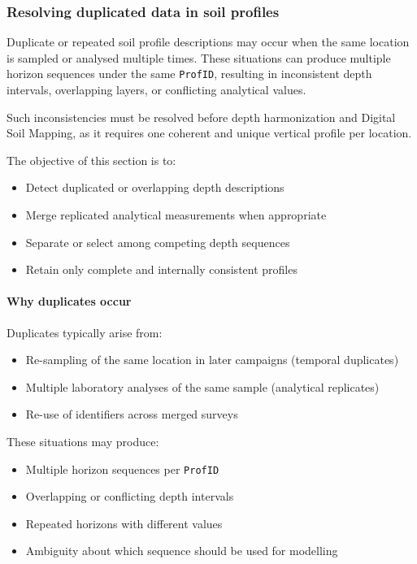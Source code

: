 \documentclass[
  10pt,
  b5paper,
  oneside]{book}
\begin{document}
\subsubsection{Resolving duplicated data in soil profiles}\label{resolving-duplicated-data-in-soil-profiles}

Duplicate or repeated soil profile descriptions may occur when the same location is sampled or analysed multiple times. These situations can produce multiple horizon sequences under the same \texttt{ProfID}, resulting in inconsistent depth intervals, overlapping layers, or conflicting analytical values.

Such inconsistencies must be resolved before depth harmonization and Digital Soil Mapping, as it requires one coherent and unique vertical profile per location.

The objective of this section is to:

\begin{itemize}
\item
  Detect duplicated or overlapping depth descriptions
\item
  Merge replicated analytical measurements when appropriate
\item
  Separate or select among competing depth sequences
\item
  Retain only complete and internally consistent profiles
\end{itemize}

\paragraph*{Why duplicates occur}\label{why-duplicates-occur}

Duplicates typically arise from:

\begin{itemize}
\item
  Re-sampling of the same location in later campaigns (temporal duplicates)
\item
  Multiple laboratory analyses of the same sample (analytical replicates)
\item
  Re-use of identifiers across merged surveys
\end{itemize}

These situations may produce:

\begin{itemize}
\item
  Multiple horizon sequences per \texttt{ProfID}
\item
  Overlapping or conflicting depth intervals
\item
  Repeated horizons with different values
\item
  Ambiguity about which sequence should be used for modelling
\end{itemize}
\end{document}
